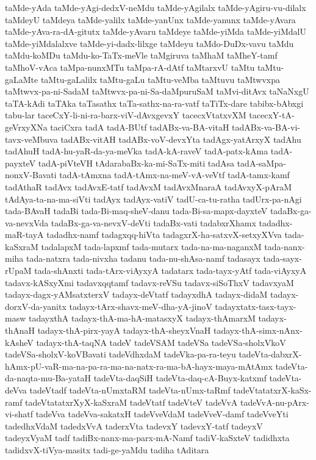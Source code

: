 {taMde-yAda
taMde-yAgi-dedxV-neMdu
taMde-yAgilalx
taMde-yAgiru-vu-dilalx
taMdeyU
taMdeya
taMde-yalilx
taMde-yanUnx
taMde-yanunx
taMde-yAvara
taMde-yAva-ra-dA-gitutx
taMde-yAvaru
taMdeye
taMde-yiMda
taMde-yiMdalU
taMde-yiMdalalxve
taMde-yi-dadx-lilxge
taMdeyu
taMdo-DuDx-vavu
taMdu
taMdu-koMDu
taMdu-ko-TaTx-meVle
taMgiruva
taMhaM
taMheY-tamf
taMhoV-vAca
taMpa-nunxMTu
taMpa-rA-dAtf
taMtarxvU
taMtu
taMtu-gaLaMte
taMtu-gaLalilx
taMtu-gaLu
taMtu-veMba
taMtuvu
taMtwvxpa
taMtwvx-pa-ni-SadaM
taMtwvx-pa-ni-Sa-daMpuruSaM
taMvi-ditAvx
taNaNxgU
taTA-kAdi
taTAka
taTasathx
taTa-sathx-na-ra-vatf
taTiTx-dare
tabibx-bAbxgi
tabu-lar
taceCxY-li-ni-ra-barx-viV-dAvxgevxY
tacecxVtatxvXM
tacecxY-tA-geVrxyXNa
taciCxra
tadA
tadA-BUtf
tadABx-va-BA-vitaH
tadABx-va-BA-vi-tavx-veMbuva
tadABx-vitAH
tadABx-voV-devxYta
tadAgx-yatArxyX
tadAhu
tadAhuH
tadA-hu-yaR-da-ya-meVka
tadA-kA-raveV
tadA-patx-kAma
tadA-payxteV
tadA-piVteVH
tAdarabaBx-ka-mi-SaTx-miti
tadAsa
tadA-saMpa-nonxV-Bavati
tadA-tAmxna
tadA-tAmx-na-meV-vA-veVtf
tadA-tamx-kamf
tadAthaR
tadAvx
tadAvxE-tatf
tadAvxM
tadAvxMnaraA
tadAvxyX-pAraM
tAdAya-ta-na-ma-siVti
tadAyx
tadAyx-vatiV
tadU-ca-tu-ratha
tadUrx-pa-nAgi
tada-BAvaH
tadaBi
tada-Bi-maq-sheV-danu
tada-Bi-sa-mapx-dayxteV
tadaBx-ga-va-nevxVda
tadaBx-ga-va-nevxV-deVti
tadaBx-vati
tadabxrXhamx
tadadhx-maR-tayA
tadadhx-namf
tadagxqq-hiVta
tadagxrX-ha-satxvX-setxyXVva
tada-kaSxraM
tadalapxM
tada-lapxmf
tada-mutarx
tada-na-ma-naganxM
tada-nanx-miha
tada-natxra
tada-nivxha
tadanu
tada-nu-shAsa-namf
tadasayx
tada-sayx-rUpaM
tada-shAnxti
tada-tArx-viAyxyA
tadatarx
tada-tayx-yAtf
tada-viAyxyA
tadavx-kASxyXmi
tadavxqqtamf
tadavx-reVSu
tadavx-siSoThxV
tadavxyaM
tadayx-dagx-yAMsatxterxV
tadayx-deVtatf
tadayxdhA
tadayx-didaM
tadayx-dorxV-da-yanitx
tadayx-tArx-shavx-meV-dha-yA-jinoV
tadayxtatx-tasx-tayx-masw
tadayxthA
tadayx-thA-ma-hA-matasxyX
tadayx-thAmarxM
tadayx-thAnaH
tadayx-thA-pirx-yayA
tadayx-thA-sheyxVnaH
tadayx-thA-simx-nAnx-kAsheV
tadayx-thA-taqNA
tadeV
tadeVSAM
tadeVSa
tadeVSa-sholxVkoV
tadeVSa-sholxV-koVBavati
tadeVdhxdaM
tadeVka-pa-ra-teyu
tadeVta-dabxrX-hAmx-pU-vaR-ma-na-pa-ra-ma-na-natx-ra-ma-bA-hayx-maya-mAtAmx
tadeVta-da-naqta-mu-Ba-yataH
tadeVta-daqSiH
tadeVta-daq-cA-Buyx-katxmf
tadeVta-deVva
tadeVtadf
tadeVta-nUmxtaRM
tadeVta-nUmx-taRmf
tadeVtatatxrX-kaSx-ramf
tadeVtatatxrXyX-kaSxraM
tadeVtatf
tadeVteV
tadeVvA
tadeVvA-nu-pArx-vi-shatf
tadeVva
tadeVva-sakatxH
tadeVveVdaM
tadeVveV-damf
tadeVveYti
tadedhxVdaM
tadedxVvA
taderxVta
tadevxY
tadevxY-tatf
tadeyxV
tadeyxVyaM
tadf
tadiBx-nanx-ma-parx-mA-Namf
tadiV-kaSxteV
tadidhxta
tadidxvX-tiVya-masitx
tadi-ge-yaMdu
tadiha
tAditara
}
